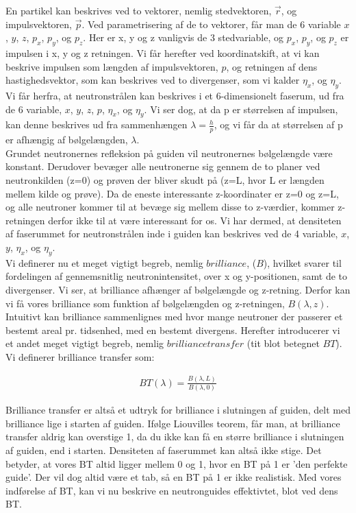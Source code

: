 \documentclass[12pt,oneside,a4paper]{article}
\begin{document}
{{{{{En partikel kan beskrives ved to vektorer, nemlig stedvektoren, $\vec{r}$, og impulsvektoren, $\vec{p}$. Ved parametrisering af de to vektorer, får man de 6 variable $x$, $y$, $z$, $p_x$, $p_y$, og $p_z$. Her er x, y og z vanligvis de 3 stedvariable, og $p_x$, $p_y$, og $p_z$ er impulsen i x, y og z retningen. Vi får herefter ved koordinatskift, at vi kan beskrive impulsen som længden af impulsvektoren, $p$, og retningen af dens hastighedsvektor, som kan beskrives ved to divergenser, som vi kalder $\eta_x$, og $\eta_y$.
Vi får herfra, at neutronstrålen kan beskrives i et 6-dimensionelt faserum, ud fra de 6 variable, $x$, $y$, $z$, $p$, $\eta_x$, og $\eta_y$. Vi ser dog, at da p er størrelsen af impulsen, kan denne  beskrives ud fra sammenhængen $\lambda=\frac{h}{p}$, og vi får da at størrelsen af p er afhængig af bølgelængden, $\lambda$. 
\\ 


Grundet neutronernes refleksion på guiden vil neutronernes bølgelængde være konstant. Derudover bevæger alle neutronerne sig gennem de to planer ved neutronkilden (z=0) og prøven der bliver skudt på (z=L, hvor L er længden mellem kilde og prøve). Da de eneste interessante z-koordinater er z=0 og z=L, og alle neutroner kommer til at bevæge sig mellem disse to z-værdier, kommer z-retningen derfor ikke til at være interessant for os. Vi har dermed, at densiteten af faserummet for neutronstrålen inde i guiden kan beskrives ved de 4 variable,  $x$, $y$, $\eta_x$, og $\eta_y$. 
\\


Vi definerer nu et meget vigtigt begreb, nemlig $brilliance$, ($B$), hvilket svarer til fordelingen af gennemsnitlig neutronintensitet, over x og y-positionen, samt de to divergenser. Vi ser, at brilliance afhænger af bølgelængde og z-retning. Derfor kan vi få vores brilliance som funktion af bølgelængden og z-retningen, $B(\lambda,z)$. Intuitivt kan brilliance sammenlignes med hvor mange neutroner der passerer et bestemt areal pr. tidsenhed, med en bestemt divergens. Herefter introducerer vi et andet meget vigtigt begreb, nemlig $brilliance transfer$ (tit blot betegnet $BT$). Vi definerer brilliance transfer som:

\begin{align}
BT(\lambda)=\frac{B(\lambda, L)}{B(\lambda,0)}
\end{align}

Brilliance transfer er altså et udtryk for brilliance i slutningen af guiden, delt med brilliance lige i starten af guiden. Ifølge Liouvilles teorem,\cite{Kaspar_PhD} får man, at brilliance transfer aldrig kan overstige 1, da du ikke kan få en større brilliance i slutningen af guiden, end i starten. Densiteten af faserummet kan altså ikke stige. Det betyder, at vores BT altid ligger mellem 0 og 1, hvor en BT på 1 er 'den perfekte guide'. Der vil dog altid være et tab, så en BT på 1 er ikke realistisk. Med vores indførelse af BT, kan vi nu beskrive en neutronguides effektivtet, blot ved dens BT. \cite{report:ess_optimizations}


}}}}}
\end{document}
